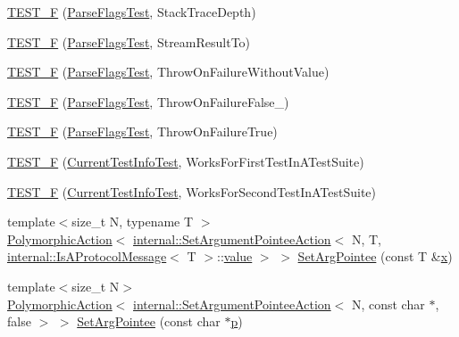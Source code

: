 \begin{DoxyCompactItemize}
\mbox{\hyperlink{namespacetesting_a1061c3a0db32c0706e9beba39c4d4324}{T\+E\+S\+T\+\_\+F}} (\mbox{\hyperlink{classtesting_1_1_parse_flags_test}{Parse\+Flags\+Test}}, Stack\+Trace\+Depth)
\item 
\mbox{\hyperlink{namespacetesting_aa4c92d2a72b78b58c0bf7f59fc2be6d6}{T\+E\+S\+T\+\_\+F}} (\mbox{\hyperlink{classtesting_1_1_parse_flags_test}{Parse\+Flags\+Test}}, Stream\+Result\+To)
\item 
\mbox{\hyperlink{namespacetesting_a1b96e71b9d6bde57bb5f7536961b5076}{T\+E\+S\+T\+\_\+F}} (\mbox{\hyperlink{classtesting_1_1_parse_flags_test}{Parse\+Flags\+Test}}, Throw\+On\+Failure\+Without\+Value)
\item 
\mbox{\hyperlink{namespacetesting_a1b5b5c2e1f15ff13cad4ac7d5415f271}{T\+E\+S\+T\+\_\+F}} (\mbox{\hyperlink{classtesting_1_1_parse_flags_test}{Parse\+Flags\+Test}}, Throw\+On\+Failure\+False\+\_)
\item 
\mbox{\hyperlink{namespacetesting_a439e3e79125f5222ddd95b8036252061}{T\+E\+S\+T\+\_\+F}} (\mbox{\hyperlink{classtesting_1_1_parse_flags_test}{Parse\+Flags\+Test}}, Throw\+On\+Failure\+True)
\item 
\mbox{\hyperlink{namespacetesting_aa98ab448e05f39e83f5d40c1597cf6f1}{T\+E\+S\+T\+\_\+F}} (\mbox{\hyperlink{classtesting_1_1_current_test_info_test}{Current\+Test\+Info\+Test}}, Works\+For\+First\+Test\+In\+A\+Test\+Suite)
\item 
\mbox{\hyperlink{namespacetesting_accb82db6202dbbc79a9597ea5d5ff234}{T\+E\+S\+T\+\_\+F}} (\mbox{\hyperlink{classtesting_1_1_current_test_info_test}{Current\+Test\+Info\+Test}}, Works\+For\+Second\+Test\+In\+A\+Test\+Suite)
\item 
{\footnotesize template$<$size\+\_\+t N, typename T $>$ }\\\mbox{\hyperlink{classtesting_1_1_polymorphic_action}{Polymorphic\+Action}}$<$ \mbox{\hyperlink{structtesting_1_1internal_1_1_set_argument_pointee_action}{internal\+::\+Set\+Argument\+Pointee\+Action}}$<$ N, T, \mbox{\hyperlink{structtesting_1_1internal_1_1_is_a_protocol_message}{internal\+::\+Is\+A\+Protocol\+Message}}$<$ T $>$\+::\mbox{\hyperlink{_obj__test_2lib_2googletest-master_2googlemock_2test_2gmock-matchers__test_8cc_a337b8a670efc0b086ad3af163f3121b6}{value}} $>$ $>$ \mbox{\hyperlink{namespacetesting_a5740a5033b88c37666fcd09a269d123f}{Set\+Arg\+Pointee}} (const T \&\mbox{\hyperlink{_obj__test_2lib_2googletest-master_2googlemock_2test_2gmock-matchers__test_8cc_a6150e0515f7202e2fb518f7206ed97dc}{x}})
\item 
{\footnotesize template$<$size\+\_\+t N$>$ }\\\mbox{\hyperlink{classtesting_1_1_polymorphic_action}{Polymorphic\+Action}}$<$ \mbox{\hyperlink{structtesting_1_1internal_1_1_set_argument_pointee_action}{internal\+::\+Set\+Argument\+Pointee\+Action}}$<$ N, const char $\ast$, false $>$ $>$ \mbox{\hyperlink{namespacetesting_a4a190fd2d02fb7cd79c5b3df3f80b647}{Set\+Arg\+Pointee}} (const char $\ast$\mbox{\hyperlink{_obj__test_2lib_2googletest-master_2googlemock_2test_2gmock-matchers__test_8cc_a6bc6b007533335efe02bafff799ec64c}{p}})

\end{DoxyCompactItemize}
